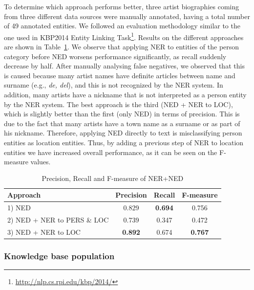 To determine which approach performs better, three artist biographies coming from three different data sources were manually annotated, having a total number of 49 annotated entities. We followed an evaluation methodology similar to the one used in KBP2014 Entity Linking Task\footnote{\url{http://nlp.cs.rpi.edu/kbp/2014/}}. Results on the different approaches are shown in Table~\ref{tbl:res1}. We observe that applying NER to entities of the person category before NED worsens performance significantly, as recall suddenly decrease by half. After manually analysing false negatives, we observed that this is caused because many artist names have definite articles between name and surname (e.g., \textit{de, del}), and this is not recognized by the NER system. In addition, many artists have a nickname that is not interpreted as a person entity by the NER system. The best approach is the third (NED + NER to LOC), which is slightly better than the first (only NED) in terms of precision. This is due to the fact that many artists have a town name as a surname or as part of his nickname. Therefore, applying NED directly to text is misclassifying person entities as location entities. Thus, by adding a previous step of NER to location entities we have increased overall performance, as it can be seen on the F-measure values.

\begin{table}
	\centering
	  \begin{tabular}{ | l | c | c | c | }
    \hline
    Approach & Precision & Recall & F-measure \\ \hline
    \hline
    1) NED & 0.829 & \textbf{0.694} & 0.756 \\ 
    2) NED + NER to PERS \& LOC & 0.739 & 0.347 & 0.472 \\
    3) NED + NER to LOC & \textbf{0.892} & 0.674 & \textbf{0.767} \\
    \hline
  \end{tabular}
	\caption{Precision, Recall and F-measure of NER+NED}
	
	\label{tbl:res1}
\end{table}

\subsubsection{Knowledge base population}\label{sec:ie}

